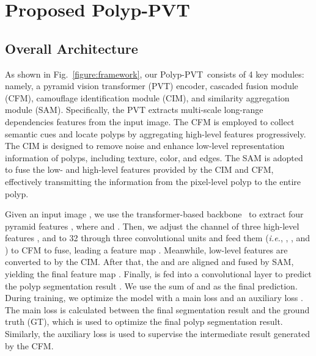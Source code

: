 \documentclass[journal]{IEEEtran}
\newcommand{\figref}[1]{Fig.~\ref{#1}}
\def\ourmodel{Polyp-PVT}
\begin{document}
\section{Proposed Polyp-PVT}\label{sec:Method}
\subsection{Overall Architecture}
As shown in \figref{figure:framework}, our
\ourmodel~consists of 4 key modules: namely, a pyramid vision transformer (PVT) encoder, cascaded fusion module (CFM), camouflage identification module (CIM), and similarity aggregation module (SAM).
Specifically, the PVT extracts multi-scale long-range dependencies features from the input image.
The CFM is employed to collect semantic cues and locate polyps by aggregating high-level features progressively.
The CIM is designed to remove noise and enhance low-level representation information of polyps, including texture, color, and edges.
The SAM is adopted to fuse the low- and high-level features provided by the CIM and CFM, effectively transmitting the information from the pixel-level polyp to the entire polyp.

Given an input image , we use the transformer-based backbone~\cite{wang2021pyramid} to extract four pyramid features , where  and .
Then, we adjust the channel of three high-level features ,  and  to 32 through three convolutional units and feed them (\emph{i.e.}, , , and ) to CFM to fuse, leading a feature map .
Meanwhile, low-level features  are converted to  by the CIM.
After that, the  and  are 
aligned and fused
by SAM, yielding the final feature map .
Finally,  is fed into a  convolutional layer to predict the polyp segmentation result . We use the sum of  and  as the final prediction.
During training, we optimize the model with a main loss  and an auxiliary loss . The main loss is calculated between the final segmentation result  and the ground truth (GT), which is used to optimize the final polyp segmentation result.
Similarly, the auxiliary loss is used to supervise the intermediate result  generated by the CFM.
\end{document}
